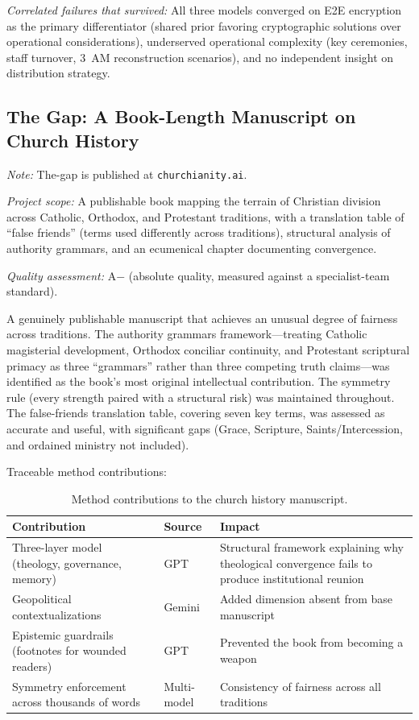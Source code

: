 \documentclass[11pt,letterpaper]{article}
\begin{document}
\emph{Correlated failures that survived:} All three models converged on E2E encryption as the primary differentiator (shared prior favoring cryptographic solutions over operational considerations), underserved operational complexity (key ceremonies, staff turnover, 3~AM reconstruction scenarios), and no independent insight on distribution strategy.

\subsection{The Gap: A Book-Length Manuscript on Church History}

\emph{Note:} The-gap is published at \texttt{churchianity.ai}.

\emph{Project scope:} A publishable book mapping the terrain of Christian division across Catholic, Orthodox, and Protestant traditions, with a translation table of ``false friends'' (terms used differently across traditions), structural analysis of authority grammars, and an ecumenical chapter documenting convergence.

\emph{Quality assessment:} A$-$ (absolute quality, measured against a specialist-team standard).

A genuinely publishable manuscript that achieves an unusual degree of fairness across traditions. The authority grammars framework---treating Catholic magisterial development, Orthodox conciliar continuity, and Protestant scriptural primacy as three ``grammars'' rather than three competing truth claims---was identified as the book's most original intellectual contribution. The symmetry rule (every strength paired with a structural risk) was maintained throughout. The false-friends translation table, covering seven key terms, was assessed as accurate and useful, with significant gaps (Grace, Scripture, Saints/Intercession, and ordained ministry not included).

Traceable method contributions:

\begin{table}[ht]
\centering
\caption{Method contributions to the church history manuscript.}
\label{tab:gap-contributions}
\begin{tabular}{@{}p{3.5cm}lp{5.5cm}@{}}
\toprule
\textbf{Contribution} & \textbf{Source} & \textbf{Impact} \\
\midrule
Three-layer model (theology, governance, memory) & GPT & Structural framework explaining why theological convergence fails to produce institutional reunion \\
\addlinespace
Geopolitical contextualizations & Gemini & Added dimension absent from base manuscript \\
\addlinespace
Epistemic guardrails (footnotes for wounded readers) & GPT & Prevented the book from becoming a weapon \\
\addlinespace
Symmetry enforcement across thousands of words & Multi-model & Consistency of fairness across all traditions \\
\bottomrule
\end{tabular}
\end{table}
\end{document}
